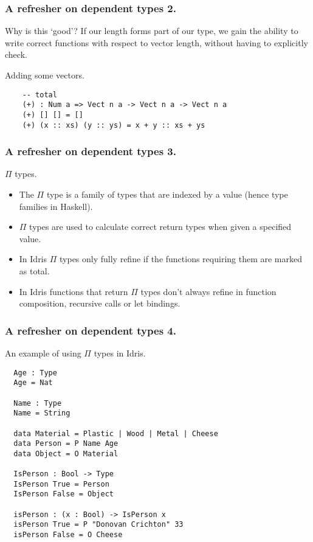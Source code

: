 \documentclass{beamer}
\begin{document}
\begin{frame}[fragile]
  \frametitle{A refresher on dependent types 2.}

  \begin{block}{Why is this `good'?}
   If our length forms part of our type, we gain the ability
          to write correct functions with respect to vector length,
          without having to explicitly check. 
  \end{block}
  \begin{block}{Adding some vectors.}
  \begin{verbatim}
    -- total
    (+) : Num a => Vect n a -> Vect n a -> Vect n a
    (+) [] [] = []
    (+) (x :: xs) (y :: ys) = x + y :: xs + ys
  \end{verbatim}
  \end{block}
\end{frame}

\begin{frame}[fragile]
  \frametitle{A refresher on dependent types 3.}
  \begin{block}{$\Pi$ types.}
    \begin{itemize}
     \item The $\Pi$ type is a family of types that are indexed by a
           value (hence type families in Haskell).
     \item $\Pi$ types are used to calculate correct return types
             when given a specified value.
     \item In Idris $\Pi$ types only fully refine if the functions
             requiring them are marked as total.
     \item In Idris functions that return $\Pi$ types don't always refine in 
             function composition, recursive calls or let bindings.
     \end{itemize}
  \end{block}
\end{frame}

\begin{frame}[fragile]
  \frametitle{A refresher on dependent types 4.}
  \begin{block}{An example of using $\Pi$ types in Idris.}
  \begin{verbatim}
  Age : Type
  Age = Nat

  Name : Type
  Name = String

  data Material = Plastic | Wood | Metal | Cheese
  data Person = P Name Age
  data Object = O Material

  IsPerson : Bool -> Type
  IsPerson True = Person
  IsPerson False = Object

  isPerson : (x : Bool) -> IsPerson x
  isPerson True = P "Donovan Crichton" 33
  isPerson False = O Cheese
  \end{verbatim}
  \end{block}
\end{frame}
\end{document}
